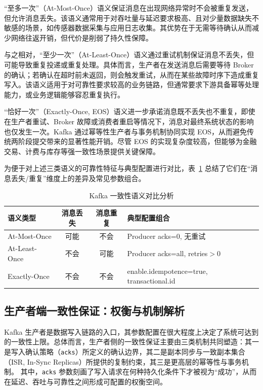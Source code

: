 “至多一次”（At-Most-Once）语义保证消息在出现网络异常时不会被重复发送，但允许消息丢失。该语义通常用于对吞吐量与延迟要求极高、且对少量数据缺失不敏感的场景，如传感器数据采集与应用日志收集。其优势在于无需等待确认从而减少网络往返开销，但代价是削弱了持久性保障。

与之相对，“至少一次”（At-Least-Once）语义通过重试机制保证消息不丢失，但可能导致重复投递或重复处理。具体而言，生产者在发送消息后需要等待 Broker 的确认；若确认在超时前未返回，则会触发重试，从而在某些故障时序下造成重复写入。该语义适用于对可靠性要求较高的业务链路，但通常要求下游具备幂等处理能力，或业务逻辑能够容忍重复执行。

“恰好一次”（Exactly-Once, EOS）语义进一步承诺消息既不丢失也不重复，即使在生产者重试、Broker 故障或消费者重启等情况下，消息对最终系统状态的影响也仅发生一次。Kafka 通过幂等性生产者与事务机制协同实现 EOS，从而避免传统两阶段提交带来的显著性能开销。尽管 EOS 的实现复杂度较高，但能够为金融交易、计费与库存等强一致性场景提供关键保障。

为便于对上述三类语义的可靠性特征与典型配置进行对比，表~\ref{tab:kafka-consistency-semantics} 总结了它们在“消息丢失/重复”维度上的差异及常见参数组合。

\begin{table}[t]
  \centering
  \caption{Kafka 一致性语义对比分析}
  \label{tab:kafka-consistency-semantics}
  \vspace{0.3em}
  \small
  \begin{tabular}{@{}lccl@{}}
    \toprule
    语义类型 & 消息丢失 & 消息重复 & 典型配置组合 \\
    \midrule
    At-Most-Once  & 可能 & 不会 & Producer acks=0, 无重试 \\
    At-Least-Once & 不会 & 可能 & Producer acks=all, retries$>$0 \\
    Exactly-Once  & 不会 & 不会 & enable.idempotence=true, transactional.id \\
    \bottomrule
  \end{tabular}
\end{table}




\subsection{生产者端一致性保证：权衡与机制解析}

Kafka 生产者是数据写入链路的入口，其参数配置在很大程度上决定了系统可达到的一致性上限。总体而言，生产者侧的一致性保证主要由三类机制共同塑造：其一是写入确认策略（\texttt{acks}）所定义的确认边界，其二是副本同步与一致副本集合（ISR, In-Sync Replicas）所提供的复制约束，其三是更高层的幂等性与事务机制。
其中，\texttt{acks} 参数刻画了写入请求在何种持久化条件下才被视为“成功”，从而在延迟、吞吐与可靠性之间形成可配置的权衡空间。

